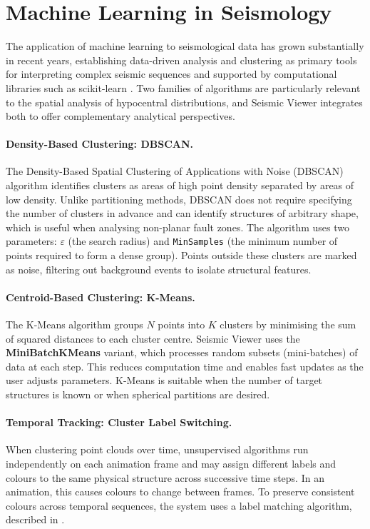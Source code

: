 \section{Machine Learning in Seismology}
\label{sec:ml-seismology}

The application of machine learning to seismological data has grown substantially in recent years, establishing data-driven analysis and clustering as primary tools for interpreting complex seismic sequences \cite{bergen2019machine, mousavi2022deep} and supported by computational libraries such as scikit-learn \cite{pedregosa2011sklearn}. Two families of algorithms are particularly relevant to the spatial analysis of hypocentral distributions, and Seismic Viewer integrates both to offer complementary analytical perspectives.

\paragraph{Density-Based Clustering: DBSCAN.}
The Density-Based Spatial Clustering of Applications with Noise (DBSCAN) algorithm \cite{ester1996dbscan} identifies clusters as areas of high point density separated by areas of low density. Unlike partitioning methods, DBSCAN does not require specifying the number of clusters in advance and can identify structures of arbitrary shape, which is useful when analysing non-planar fault zones. The algorithm uses two parameters: $\varepsilon$ (the search radius) and \texttt{MinSamples} (the minimum number of points required to form a dense group). Points outside these clusters are marked as noise, filtering out background events to isolate structural features.

\paragraph{Centroid-Based Clustering: K-Means.}
The K-Means algorithm \cite{lloyd1982kmeans} groups $N$ points into $K$ clusters by minimising the sum of squared distances to each cluster centre. Seismic Viewer uses the \textbf{MiniBatchKMeans} variant, which processes random subsets (mini-batches) of data at each step. This reduces computation time and enables fast updates as the user adjusts parameters. K-Means is suitable when the number of target structures is known or when spherical partitions are desired.

\paragraph{Temporal Tracking: Cluster Label Switching.}
When clustering point clouds over time, unsupervised algorithms run independently on each animation frame and may assign different labels and colours to the same physical structure across successive time steps. In an animation, this causes colours to change between frames. To preserve consistent colours across temporal sequences, the system uses a label matching algorithm, described in .

